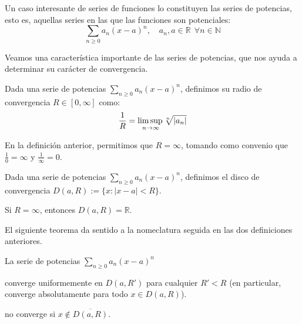 Un caso interesante de series de funciones lo constituyen las series de potencias, esto es, aquellas series en las que las funciones son potenciales: $$\sum_{n \ge 0} a_n(x-a)^n, \quad a_n, a \in \mathbb{R} \ \ \forall n \in \mathbb{N}$$

Veamos una característica importante de las series de potencias, que nos ayuda a determinar su carácter de convergencia.

\begin{ndef} Dada una serie de potencias $\sum_{n \ge 0} a_n(x-a)^n$, definimos su radio de convergencia $R \in [0, \infty]$ como: $$
  \frac{1}{R} =\underset{n\to\infty}{\mbox{lim\,sup\,}}  \sqrt[n]{|a_n|}$$
\end{ndef}

\begin{nota}
  En la definición anterior, permitimos que $R = \infty$, tomando como convenio que $\frac{1}{0} = \infty$ y $\frac{1}{\infty} = 0$.
\end{nota}

\begin{ndef} Dada una serie de potencias $\sum_{n \ge 0} a_n(x-a)^n$, definimos el disco de convergencia $D(a,R) := \{ x : |x-a| < R\}$.
\end{ndef}

\begin{nota}
  Si $R = \infty$, entonces $D(a,R) = \mathbb{R}$.
\end{nota}

El siguiente teorema da sentido a la nomeclatura seguida en las dos definiciones anteriores.

\begin{nth} \label{13}
  La serie de potencias $\displaystyle\sum_{n\geq 0} a_n (x-a)^n$
  \begin{nlist}
  \item converge uniformemente en $D(a,R')$ para cualquier $R'<R$ (en particular, converge absolutamente para todo $x\in D(a,R)$).
  \item no converge si $x\not\in \overline{D(a,R)}$.
  \end{nlist}
\end{nth}

